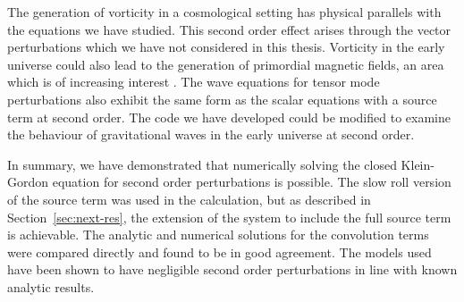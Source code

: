 The generation of vorticity in a cosmological setting has physical parallels with the equations we
have studied. This second order effect arises through the vector perturbations which we have not
considered in this thesis. Vorticity in the early universe could also lead to the generation of
primordial magnetic fields, an area which is of increasing interest
\cite{Christopherson:2009bt,1950ZNatA...5...65B}.
% 
The wave equations for tensor mode perturbations also exhibit the same form as the scalar equations
with a source term at second order. The code we have developed could be modified to examine the
behaviour of gravitational waves in the early universe at second order.

In summary, we have demonstrated that numerically solving the closed
Klein-Gordon equation for second order perturbations is possible. The slow roll
version of the source term was used in the calculation, but
as described in Section~\ref{sec:next-res}, the extension of the system to include
the full source term is achievable. 
The analytic and numerical solutions for the convolution terms were
compared directly and found to be in good agreement.
The models used have been shown to have negligible second order
perturbations in line with known analytic results. 
